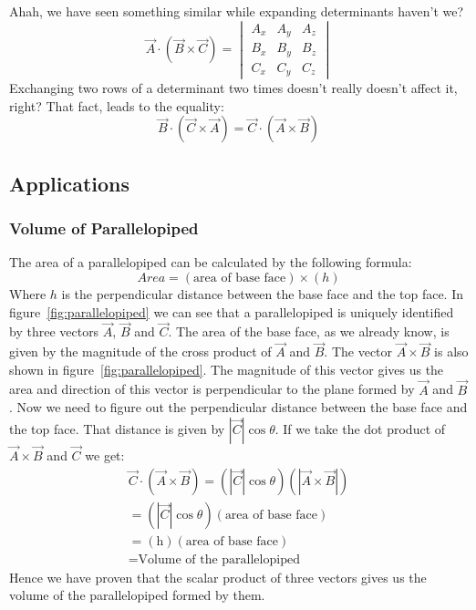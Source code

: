             Ahah, we have seen something similar while expanding determinants haven't we?
            \begin{equation}\label{eq:scalartriple}
            \vec{A}\cdot\left(\vec{B}\times\vec{C}\right) = \begin{vmatrix}A_x & A_y & A_z\\ B_x & B_y & B_z\\ C_x & C_y & C_z\end{vmatrix}
            \end{equation}
            Exchanging two rows of a determinant two times doesn't really doesn't affect it, right? That fact, leads to the equality:
            $$\vec{B}\cdot\left(\vec{C}\times\vec{A}\right) = \vec{C}\cdot\left(\vec{A}\times\vec{B}\right)$$
        \subsection{Applications}
            \subsubsection{Volume of Parallelopiped}
                
                The area of a parallelopiped can be calculated by the following formula:
                $$Area = (\textrm{area of base face})\times(h)$$
                Where $h$ is the perpendicular distance between the base face and the top face.
                In figure~\ref{fig:parallelopiped} we can see that a parallelopiped is uniquely identified by three vectors $\vec{A}$, $\vec{B}$ and $\vec{C}$. The area of the base face, as we already know, is given by the magnitude of the cross product of $\vec{A}$ and $\vec{B}$. The vector $\vec{A}\times\vec{B}$ is also shown in figure~\ref{fig:parallelopiped}. The magnitude of this vector gives us the area and direction of this vector is perpendicular to the plane formed by $\vec{A}$ and $\vec{B}$. Now we need to figure out the perpendicular distance between the base face and the top face. That distance is given by $|\vec{C}|\cos\theta$. If we take the dot product of $\vec{A}\times\vec{B}$ and $\vec{C}$ we get:
                \begin{align*}
                    \vec{C}\cdot\left(\vec{A}\times\vec{B}\right) = \left(|\vec{C}|\cos\theta\right)\left(|\vec{A}\times\vec{B}|\right)\\ 
                    = \left(|\vec{C}|\cos\theta\right)\left(\textrm{area of base face}\right)\\
                    = \left(\textrm{h}\right)\left(\textrm{area of base face}\right)\\
                    = \textrm{Volume of the parallelopiped}
                \end{align*}
                Hence we have proven that the scalar product of three vectors gives us the volume of the parallelopiped formed by them.
